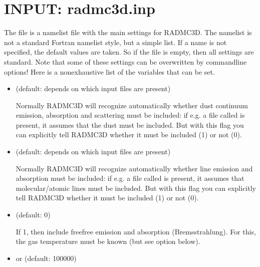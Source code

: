 \documentclass[letterpaper,10pt,english]{sphinxmanual}
\begin{document}
\section{INPUT: radmc3d.inp}
\label{\detokenize{inputoutputfiles:input-radmc3d-inp}}\label{\detokenize{inputoutputfiles:sec-radmc-inp}}
The  file is a namelist file with the main settings for
RADMC\sphinxhyphen{}3D. The namelist is not a standard Fortran namelist style, but a simple
 list. If a name is not specified, the default values are taken.
So if the  file is empty, then all settings are standard.  Note
that some of these settings can be overwritten by command\sphinxhyphen{}line options! Here
is a non\sphinxhyphen{}exhaustive list of the variables that can be set.
\begin{itemize}
\item {} 
 (default: depends on which input files are present)

Normally RADMC\sphinxhyphen{}3D will recognize automatically whether dust continuum
emission, absorption and scattering must be included: if e.g. a file
called  is present, it assumes that the dust
must be included. But with this flag you can explicitly tell RADMC\sphinxhyphen{}3D
whether it must be included (1) or not (0).

\item {} 
 (default: depends on which input files are present)

Normally RADMC\sphinxhyphen{}3D will recognize automatically whether line emission and
absorption must be included: if e.g. a file called 
is present, it assumes that molecular/atomic lines must be included. But
with this flag you can explicitly tell RADMC\sphinxhyphen{}3D whether it must be
included (1) or not (0).

\item {} 
 (default: 0)

If 1, then include free\sphinxhyphen{}free emission and absorption (Bremsstrahlung).  For
this, the gas temperature must be known (but see option 
below).

\item {} 
 or  (default: 100000)


\end{itemize}
\end{document}
